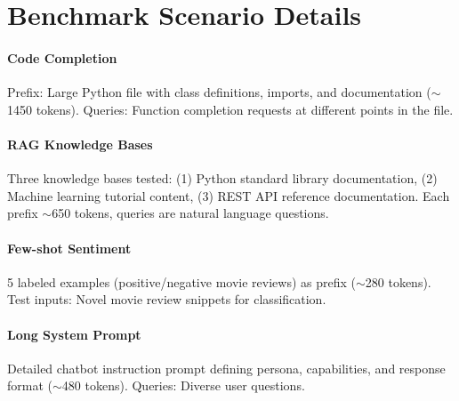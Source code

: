 \documentclass{article}
\begin{document}
\section{Benchmark Scenario Details}
\label{app:scenarios}

\paragraph{Code Completion}
Prefix: Large Python file with class definitions, imports, and documentation ($\sim$1450 tokens).
Queries: Function completion requests at different points in the file.

\paragraph{RAG Knowledge Bases}
Three knowledge bases tested:
(1) Python standard library documentation,
(2) Machine learning tutorial content,
(3) REST API reference documentation.
Each prefix $\sim$650 tokens, queries are natural language questions.

\paragraph{Few-shot Sentiment}
5 labeled examples (positive/negative movie reviews) as prefix ($\sim$280 tokens).
Test inputs: Novel movie review snippets for classification.

\paragraph{Long System Prompt}
Detailed chatbot instruction prompt defining persona, capabilities, and response format ($\sim$480 tokens).
Queries: Diverse user questions.
\end{document}
